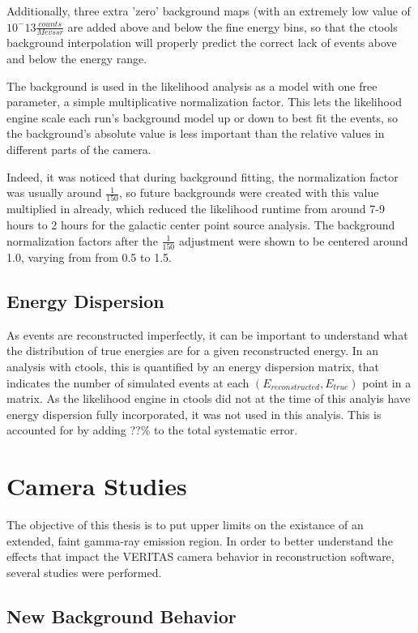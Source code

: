 Additionally, three extra 'zero' background maps (with an extremely low value of $10^-13 \frac{counts}{Mev s sr}$ are added above and below the fine energy bins, so that the ctools background interpolation will properly predict the correct lack of events above and below the energy range.

The background is used in the likelihood analysis as a model with one free parameter, a simple multiplicative normalization factor.
This lets the likelihood engine scale each run's background model up or down to best fit the events, so the background's absolute value is less important than the relative values in different parts of the camera.

Indeed, it was noticed that during background fitting, the normalization factor was usually around $\frac{1}{150}$, so future backgrounds were created with this value multiplied in already, which reduced the likelihood runtime from around 7-9 hours to 2 hours for the galactic center point source analysis.
The background normalization factors after the $\frac{1}{150}$ adjustment were shown to be centered around 1.0, varying from from 0.5 to 1.5.


\subsection{Energy Dispersion}\label{subsec:edisp}
As events are reconstructed imperfectly, it can be important to understand what the distribution of true energies are for a given reconstructed energy.
In an analysis with ctools, this is quantified by an energy dispersion matrix, that indicates the number of simulated events at each $(E_{reconstructed},E_{true})$ point in a matrix.
As the likelihood engine in ctools did not at the time of this analyis have energy dispersion fully incorporated, it was not used in this analyis.
This is accounted for by adding ??\% to the total systematic error.

\section{Camera Studies}
The objective of this thesis is to put upper limits on the existance of an extended, faint gamma-ray emission region.
In order to better understand the effects that impact the VERITAS camera behavior in reconstruction software, several studies were performed.

\subsection{New Background Behavior}

